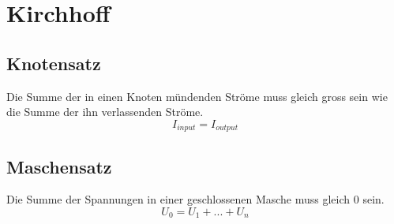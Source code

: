 \section*{Kirchhoff}
\subsection*{Knotensatz}
Die Summe der in einen Knoten mündenden Ströme muss gleich gross sein wie die Summe der ihn verlassenden Ströme.
\[I_{input} = I_{output}\]
\subsection*{Maschensatz}
Die Summe der Spannungen in einer geschlossenen Masche muss gleich 0 sein.
\[U_0 = U_1 + ... + U_n\]
